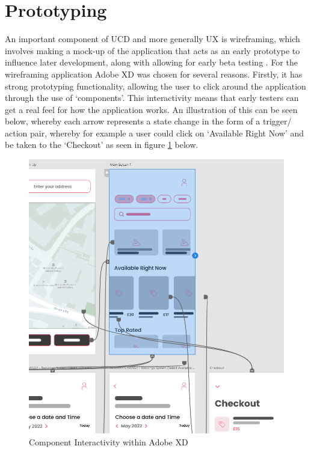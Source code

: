 \documentclass[12pt]{article}
\begin{document}
	\section{Prototyping}
	An important component of UCD and more generally UX is wireframing, which involves making a mock-up of the application that acts as an early prototype to influence later development, along with allowing for early beta testing \cite{Arnowitz Arent Berger}. For the wireframing application Adobe XD was chosen for several reasons. Firstly, it has strong prototyping functionality, allowing the user to click around the application through the use of ‘components’. This interactivity means that early testers can get a real feel for how the application works. An illustration of this can be seen below, whereby each arrow represents a state change in the form of a trigger/ action pair, whereby for example a user could click on ‘Available Right Now’ and be taken to the ‘Checkout’ as seen in figure \ref{fig:prot-comp} below.
		\begin{figure}[H]
		\centering
		\includegraphics[scale=0.5]{images/prototyping-components.png}
		\caption{Component Interactivity within Adobe XD}
		\label{fig:prot-comp}
	\end{figure}
	
\end{document}

